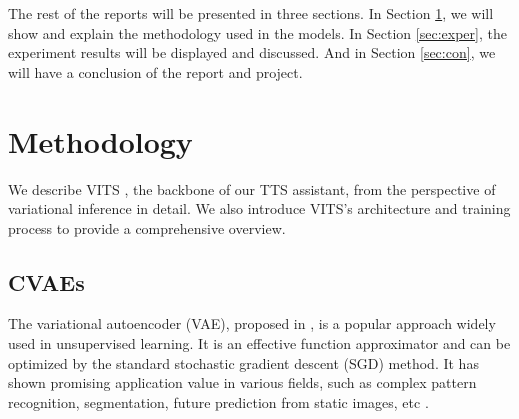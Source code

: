 \documentclass{article}
\begin{document}
The rest of the reports will be presented in three sections. In Section \ref{sec:method},  we will show and explain the methodology used in the models. In Section \ref{sec:exper}, the experiment results will be displayed and discussed. And in Section \ref{sec:con}, we will have a conclusion of the report and project.

\section{Methodology}
\label{sec:method}

We describe VITS \cite{2021kim}, the backbone of our TTS assistant, from the perspective of variational inference in detail. We also introduce VITS's architecture and training process to provide a comprehensive overview.

\subsection{CVAEs}
The variational autoencoder (VAE), proposed in \cite{2022kingma}, is a popular approach widely used in unsupervised learning. It is an effective function approximator and can be optimized by the standard stochastic gradient descent (SGD) method. It has shown promising application value in various fields, such as complex pattern recognition, segmentation, future prediction from static images, etc \cite{2021doersch}.
\end{document}
